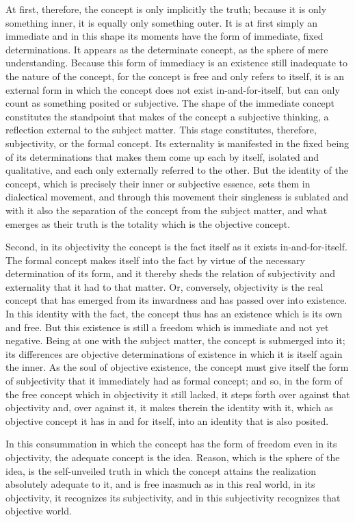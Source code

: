 At first, therefore, the concept is
only implicitly the truth;
because it is only something inner,
it is equally only something outer.
It is at first simply an immediate
and in this shape its moments have
the form of immediate, fixed determinations.
It appears as the determinate concept,
as the sphere of mere understanding.
Because this form of immediacy is an existence
still inadequate to the nature of the concept,
for the concept is free and only refers to itself,
it is an external form in which the concept
does not exist in-and-for-itself,
but can only count as something posited or subjective.
The shape of the immediate concept
constitutes the standpoint that makes
of the concept a subjective thinking,
a reflection external to the subject matter.
This stage constitutes, therefore, subjectivity,
or the formal concept.
Its externality is manifested in
the fixed being of its determinations
that makes them come up each by itself,
isolated and qualitative,
and each only externally referred to the other.
But the identity of the concept,
which is precisely their inner or subjective essence,
sets them in dialectical movement,
and through this movement their singleness is sublated
and with it also the separation of
the concept from the subject matter,
and what emerges as their truth is
the totality which is the objective concept.

Second, in its objectivity the concept is
the fact itself as it exists in-and-for-itself.
The formal concept makes itself into the fact
by virtue of the necessary determination of its form,
and it thereby sheds the relation
of subjectivity and externality
that it had to that matter.
Or, conversely, objectivity is the real concept
that has emerged from its inwardness
and has passed over into existence.
In this identity with the fact,
the concept thus has an existence
which is its own and free.
But this existence is still a freedom
which is immediate and not yet negative.
Being at one with the subject matter,
the concept is submerged into it;
its differences are objective
determinations of existence
in which it is itself again the inner.
As the soul of objective existence,
the concept must give itself the form of subjectivity
that it immediately had as formal concept;
and so, in the form of the free concept
which in objectivity it still lacked,
it steps forth over against that objectivity
and, over against it, it makes therein the identity with it,
which as objective concept it has in and for itself,
into an identity that is also posited.

In this consummation in which
the concept has the form of freedom
even in its objectivity,
the adequate concept is the idea.
Reason, which is the sphere of the idea,
is the self-unveiled truth
in which the concept attains
the realization absolutely adequate to it,
and is free inasmuch as in this real world,
in its objectivity, it recognizes its subjectivity,
and in this subjectivity recognizes that objective world.

